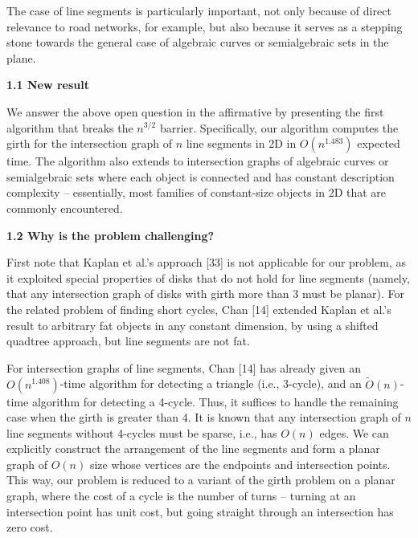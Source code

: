 \documentclass[10pt,a4paper]{article}
\begin{document}
\par
\par
The case of line segments is particularly important, not only because of direct relevance to road networks, for example, but also because it serves as a stepping stone towards the general case of algebraic curves or semialgebraic sets in the plane.
\par
\par
\par\medskip\noindent\textbf{1.1 New result}\par
We answer the above open question in the affirmative by presenting the first algorithm that breaks the $n^{3/2}$ barrier. Specifically, our algorithm computes the girth for the intersection graph of $n$ line segments in 2D in $O(n^{1.483})$ expected time. The algorithm also extends to intersection graphs of algebraic curves or semialgebraic sets where each object is connected and has constant description complexity – essentially, most families of constant-size objects in 2D that are commonly encountered.
\par
\par
\par\medskip\noindent\textbf{1.2 Why is the problem challenging?}\par
First note that Kaplan et al.’s approach [33] is not applicable for our problem, as it exploited special properties of disks that do not hold for line segments (namely, that any intersection graph of disks with girth more than 3 must be planar). For the related problem of finding short cycles, Chan [14] extended Kaplan et al.’s result to arbitrary fat objects in any constant dimension, by using a shifted quadtree approach, but line segments are not fat.
\par
\par
For intersection graphs of line segments, Chan [14] has already given an $O(n^{1.408})$-time algorithm for detecting a triangle (i.e., 3-cycle), and an $\widetilde{O}(n)$-time algorithm for detecting a 4-cycle. Thus, it suffices to handle the remaining case when the girth is greater than 4. It is known that any intersection graph of $n$ line segments without 4-cycles must be sparse, i.e., has $O(n)$ edges. We can explicitly construct the arrangement of the line segments and form a planar graph of $O(n)$ size whose vertices are the endpoints and intersection points. This way, our problem is reduced to a variant of the girth problem on a planar graph, where the cost of a cycle is the number of turns – turning at an intersection point has unit cost, but going straight through an intersection has zero cost.
\end{document}
